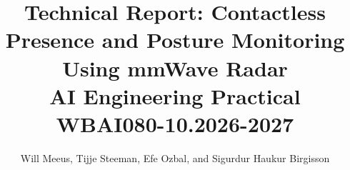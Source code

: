 




\raggedbottom
\pagestyle{body}

\title{
    \vspace{5cm}
           {\bf
           {\Huge Technical Report: Contactless Presence and Posture Monitoring Using mmWave Radar}}\\
    \vspace{1cm}
        {\bf
        {\Large AI Engineering Practical}}\\
        {\large WBAI080-10.2026-2027}
}
\date{}
\author{Will Meeus, Tijje Steeman, Efe Ozbal, and Sigurdur Haukur Birgisson}

\setlength{\headheight}{78pt}
\maketitle
\thispagestyle{titlepage}

